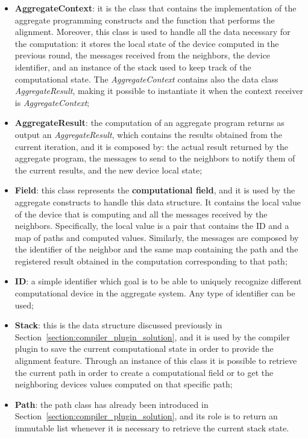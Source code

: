 \begin{itemize}
    \item \textbf{AggregateContext}: it is the class that contains the implementation of the aggregate programming constructs and the function that performs the alignment. Moreover, this class is used to handle all the data necessary for the computation: it stores the local state of the device computed in the previous round, the messages received from the neighbors, the device identifier, and an instance of the stack used to keep track of the computational state. The \textit{AggregateContext} contains also the data class \textit{AggregateResult}, making it possible to instantiate it when the context receiver is \textit{AggregateContext};
    \item \textbf{AggregateResult}: the computation of an aggregate program returns as output an \textit{AggregateResult}, which contains the results obtained from the current iteration, and it is composed by: the actual result returned by the aggregate program, the messages to send to the neighbors to notify them of the current results, and the new device local state;
    \item \textbf{Field}: this class represents the \textbf{computational field}, and it is used by the aggregate constructs to handle this data structure. It contains the local value of the device that is computing and all the messages received by the neighbors. Specifically, the local value is a pair that contains the ID and a map of paths and computed values. Similarly, the messages are composed by the identifier of the neighbor and the same map containing the path and the registered result obtained in the computation corresponding to that path;
    \item \textbf{ID}: a simple identifier which goal is to be able to uniquely recognize different computational device in the aggregate system. Any type of identifier can be used;
    \item \textbf{Stack}: this is the data structure discussed previously in Section~\ref{section:compiler_plugin_solution}, and it is used by the compiler plugin to save the current computational state in order to provide the alignment feature. Through an instance of this class it is possible to retrieve the current path in order to create a computational field or to get the neighboring devices values computed on that specific path;
    \item \textbf{Path}: the path class has already been introduced in Section~\ref{section:compiler_plugin_solution}, and its role is to return an immutable list whenever it is necessary to retrieve the current stack state.
\end{itemize}

